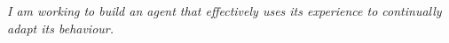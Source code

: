 \documentclass[11pt, a4paper]{awesome-cv}
\begin{document}




\begin{center}
  {\fontsize{10pt}{1em}\bodyfont\slshape\color{awesome}
    I am working to
    build
    an agent that effectively uses its experience to continually adapt its behaviour.}
\end{center}



% 



% 
\end{document}
